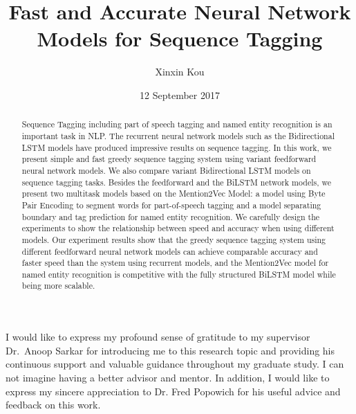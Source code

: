 \documentclass{sfuthesis}
\title{Fast and Accurate Neural Network Models for Sequence Tagging}
\author{Xinxin Kou}
\date{12 September 2017}
\begin{document}
\frontmatter
\maketitle{}
\makecommittee{}

\begin{abstract}
Sequence Tagging including part of speech tagging and named entity recognition is an important task in NLP. The recurrent neural network models such as the Bidirectional LSTM models have produced impressive results on sequence tagging. In this work, we present simple and fast greedy sequence tagging system using variant feedforward neural network models. We also compare variant Bidirectional LSTM models on sequence tagging tasks. Besides the feedforward and the BiLSTM network models, we present two multitask models based on the Mention2Vec Model: a model using Byte Pair Encoding to segment words for part-of-speech tagging and a model separating boundary and tag prediction for named entity recognition. We carefully design the experiments to show the relationship between speed and accuracy when using different models. Our experiment results show that the greedy sequence tagging system using different feedforward neural network models can achieve comparable accuracy and faster speed than the system using recurrent models, and the Mention2Vec model for named entity recognition is competitive with the fully structured BiLSTM model while being more scalable.

\end{abstract}


\begin{acknowledgements} %

I would like to express my profound sense of gratitude to my supervisor Dr.\ Anoop Sarkar for introducing me to this research
topic and providing his continuous support and valuable guidance throughout my graduate study. I can not imagine having a better advisor and mentor. In addition, I would like to express my sincere appreciation to Dr. Fred Popowich for his useful advice and feedback on this work.




\end{acknowledgements}

\tableofcontents\clearpage
{}\listoftables\clearpage
{}\listoffigures





%
%
\end{document}
